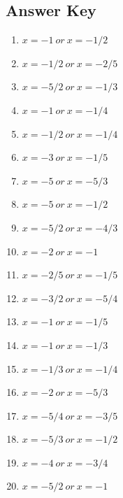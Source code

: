 \documentclass{article}
\begin{document}
\newpage

\subsection*{Answer Key}

\begin{enumerate}
\item $\displaystyle x =-1\ or \ x =-1/2 $ \ 
\item $\displaystyle x =-1/2\ or \ x =-2/5 $ \ 
\item $\displaystyle x =-5/2\ or \ x =-1/3 $ \ 
\item $\displaystyle x =-1\ or \ x =-1/4 $ \ 
\item $\displaystyle x =-1/2\ or \ x =-1/4 $ \ 
\item $\displaystyle x =-3\ or \ x =-1/5 $ \ 
\item $\displaystyle x =-5\ or \ x =-5/3 $ \ 
\item $\displaystyle x =-5\ or \ x =-1/2 $ \ 
\item $\displaystyle x =-5/2\ or \ x =-4/3 $ \ 
\item $\displaystyle x =-2\ or \ x =-1 $ \ 
\item $\displaystyle x =-2/5\ or \ x =-1/5 $ \ 
\item $\displaystyle x =-3/2\ or \ x =-5/4 $ \ 
\item $\displaystyle x =-1\ or \ x =-1/5 $ \ 
\item $\displaystyle x =-1\ or \ x =-1/3 $ \ 
\item $\displaystyle x =-1/3\ or \ x =-1/4 $ \ 
\item $\displaystyle x =-2\ or \ x =-5/3 $ \ 
\item $\displaystyle x =-5/4\ or \ x =-3/5 $ \ 
\item $\displaystyle x =-5/3\ or \ x =-1/2 $ \ 
\item $\displaystyle x =-4\ or \ x =-3/4 $ \ 
\item $\displaystyle x =-5/2\ or \ x =-1 $ \ 

\end{enumerate}
\end{document}
